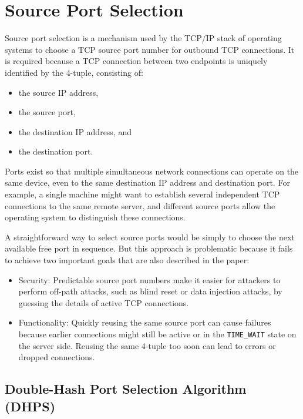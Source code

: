 \documentclass{report}
\begin{document}
\section{Source Port Selection}
\label{sec:source port selection}

Source port selection is a mechanism used by the TCP/IP stack of operating systems to choose a TCP source port number for outbound TCP connections. It is required because a TCP connection between two endpoints is uniquely identified by the \alert{4-tuple}, consisting of:
\begin{itemize}
    \item the \alert{source IP} address,
    \item the \alert{source port},
    \item the \alert{destination IP} address, and
    \item the \alert{destination port}.
\end{itemize}

Ports exist so that multiple simultaneous network connections can operate on the same device, even to the same destination IP address and destination port. For example, a single machine might want to establish several independent TCP connections to the same remote server, and different source ports allow the operating system to distinguish these connections.  

A straightforward way to select source ports would be simply to choose the next available free port in sequence. But this approach is problematic because it fails to achieve two important goals that are also described in the paper:

\begin{itemize}
    \item \alert{Security:} Predictable source port numbers make it easier for attackers to perform off-path attacks, such as blind reset or data injection attacks, by guessing the details of active TCP connections.
    \item \alert{Functionality:} Quickly reusing the same source port can cause failures because earlier connections might still be active or in the \texttt{TIME\_WAIT} state on the server side. Reusing the same 4-tuple too soon can lead to errors or dropped connections.
\end{itemize}

\subsection{Double-Hash Port Selection Algorithm (DHPS)}
\label{sec:double-hash port selection algorithm}
\end{document}
